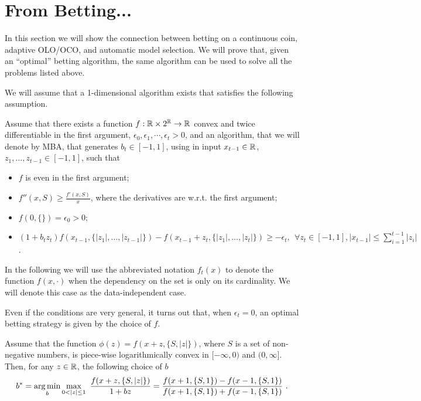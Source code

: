 \section{From Betting...}

In this section we will show the connection between betting on a continuous coin, adaptive \ac{OLO}/\ac{OCO}, and automatic model selection. We will prove that, given an ``optimal'' betting algorithm, the same algorithm can be used to solve all the problems listed above.

We will assume that a 1-dimensional algorithm exists that satisfies the following assumption.
\begin{assumption}
\label{assumption:1-d_algo}
Assume that there exists a function $f:\mathbb{R} \times 2^{\mathbb{R}} \rightarrow \mathbb{R}$ convex and twice differentiable in the first argument, $\epsilon_0, \epsilon_1,\cdots, \epsilon_t>0$, and an algorithm, that we will denote by \ac{MBA}, that generates $b_t \in [-1 , 1]$, using in input $x_{t-1} \in \mathbb{R}$, $z_1, \ldots, z_{t-1} \in [-1,1]$, such that
\begin{itemize}
\item $f$ is even in the first argument;
\item $f''(x, S) \geq \frac{f'(x,S)}{x}$, where the derivatives are w.r.t. the first argument;
\item $f(0,\{\})=\epsilon_0>0$;
\item  $
(1+b_t z_t) f\left( x_{t-1}, \{|z_1|, \ldots, |z_{t-1}|\} \right) - f\left( x_{t-1}+z_t, \{|z_1|, \ldots, |z_t|\}\right) \geq -\epsilon_t, \ \ \forall z_{t} \in [-1,1], |x_{t-1}| \leq \sum_{i=1}^{t-1} |z_i|
$.
\end{itemize}
\end{assumption}
In the following we will use the abbreviated notation $f_t(x)$ to denote the function $f(x,\cdot)$ when the dependency on the set is only on its cardinality. We will denote this case as the data-independent case.

Even if the conditions are very general, it turns out that, when $\epsilon_t=0$, an optimal betting strategy is given by the choice of $f$.
\begin{theorem}
\label{theo:opt_beta}
Assume that the function $\phi(z)=f(x+z,\{S, |z|\})$, where $S$ is a set of non-negative numbers, is piece-wise logarithmically convex in $[-\infty,0)$ and $(0,\infty]$. Then, for any $z\in \mathbb{R}$,  the following choice of $b$
\[
b^* = \argmin_{b} \max_{0<|z|\leq 1} \ \frac{f(x+z,\{S, |z|\})}{1+b z} =\frac{f(x+1,\{S, 1\}) - f(x-1,\{S, 1\})}{f(x+1,\{S, 1\}) + f(x-1,\{S, 1\})}~.
\]
\end{theorem}


